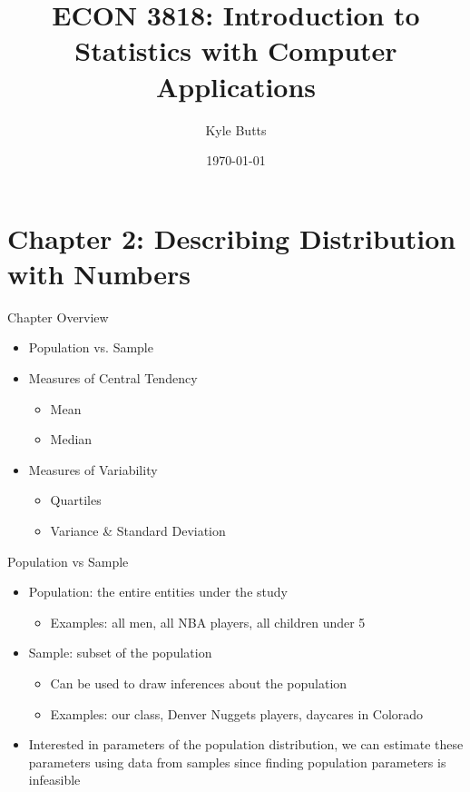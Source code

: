 \documentclass{beamer}
\title{ECON 3818: Introduction to Statistics with Computer Applications}
\date{\today}
\author{Kyle Butts}
\begin{document}
\maketitle


\section{Chapter 2: Describing Distribution with Numbers}

\begin{frame}{Chapter Overview}
	
	\begin{itemize}
		\item Population vs. Sample
		\item Measures of Central Tendency
		      \begin{itemize}
		      	\item Mean
		      	\item Median
		      \end{itemize}
		\item Measures of Variability
		      \begin{itemize}
		      	\item Quartiles
		      	\item Variance \& Standard Deviation
		      \end{itemize}
	\end{itemize}
	
\end{frame}

\begin{frame}{Population vs Sample}
	
	\begin{itemize}
		\item \alert{Population}: the entire entities under the study
		      \begin{itemize}
		      	\item Examples: all men, all NBA players, all children under 5
		      \end{itemize}
		\item \alert{Sample}: subset of the population
		      \begin{itemize}
		      	\item Can be used to draw inferences about the population
		      	\item Examples: our class, Denver Nuggets players, daycares in Colorado
		      \end{itemize}
		\item Interested in parameters of the population distribution, we can estimate these parameters using data from samples since finding population parameters is infeasible
	\end{itemize}
\end{frame}
\end{document}
